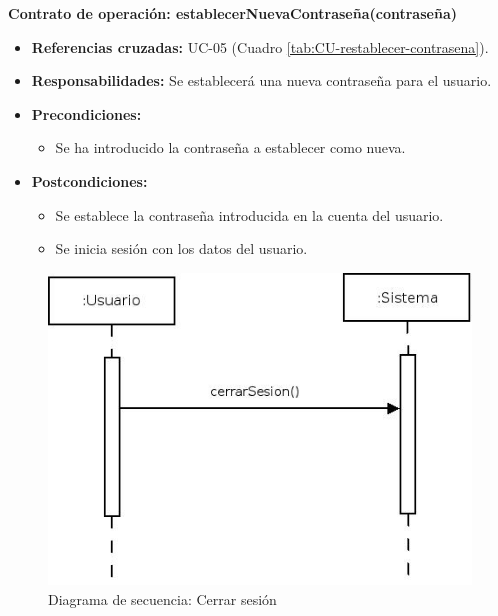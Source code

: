 \textbf{Contrato de operación: establecerNuevaContraseña(contraseña)}
\begin{itemize}
\item \textbf{Referencias cruzadas:} UC-05 (Cuadro \ref{tab:CU-restablecer-contrasena}).
\item \textbf{Responsabilidades:} Se establecerá una nueva contraseña para el usuario.
\item \textbf{Precondiciones:} 
 \begin{itemize}
\item Se ha introducido la contraseña a establecer como nueva.
\end {itemize}
\item \textbf{Postcondiciones:} 
 \begin{itemize}
\item Se establece la contraseña introducida en la cuenta del usuario.
\item Se inicia sesión con los datos del usuario. 
\end {itemize}
\end {itemize}


\vspace{10mm}

\begin{figure}[H]
\centering
  \includegraphics[scale=.55]{img/secuencias/gestion-usuarios-cerrar-sesion.jpeg}
  \caption{Diagrama de secuencia: Cerrar sesión}
  \label{fig:secuencia-gestion-usuarios-cerrar-sesion}
\end{figure}

